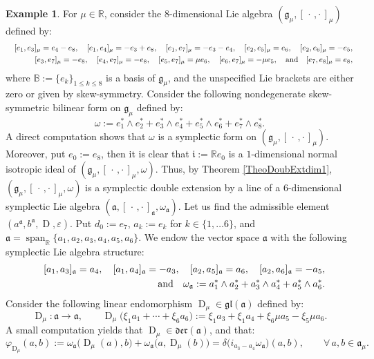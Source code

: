 \documentclass[final,1p,times,nopreprintline]{elsarticle}
\theoremstyle{definition}
\newtheorem{example}{Example}[section]
\numberwithin{equation}{section}
\newcommand{\rel}{\mathbb{R}}
\newcommand{\w}{\omega}
\newcommand{\et}{\quad \textnormal{and}\quad}
\newcommand{\g}{\mathfrak{g}}
\newcommand{\ai}{\mathfrak{a}}
\newcommand{\Span}{\operatorname{span}}
\numberwithin{equation}{section}
\newcommand{\D}{\operatorname{D}}
\newcommand{\gl}{\mathfrak{gl}}
\newcommand{\cro}{[\,\cdot\,,\cdot\,]}
\begin{document}
\begin{example}
For $\mu\in\rel$, consider the $8$-dimensional Lie algebra $(\g_\mu,\cro_\mu)$ defined by:
\begin{eqnarray*}
&&[e_1,e_3]_\mu=e_4-e_8,\quad [e_1,e_4]_\mu=-e_3+e_8,\quad [e_1,e_7]_\mu=-e_3-e_4,\quad [e_2,e_5]_\mu=e_6,\quad[e_2,e_6]_\mu=-e_5,\\
&&[e_3,e_7]_\mu=-e_8,\quad [e_4,e_7]_\mu=-e_8,\quad [e_5,e_7]_\mu=\mu e_6,\quad
[e_6,e_7]_\mu=-\mu e_5,\et [e_7,e_8]_\mu=e_8,
\end{eqnarray*}
where $\mathbb{B}:=\{e_k\}_{1\leqslant k\leqslant 8}$ is a basis of $\g_\mu$, and the unspecified Lie brackets are either zero or given by skew-symmetry. Consider the following nondegenerate skew-symmetric bilinear form on $\g_\mu$ defined by:
\begin{equation*}
\w:=e_1^*\wedge e_2^*+e_3^*\wedge e_4^*+e_5^*\wedge e_6^*+e_7^*\wedge e_8^*.
\end{equation*}
A direct computation shows that $\w$ is a symplectic form on $(\g_\mu,\cro_\mu)$. Moreover, put $e_0:=e_8$, then it is clear that $\mathfrak{i}:=\rel e_0$ is a $1$-dimensional normal isotropic ideal of $(\g_\mu,\cro_\mu,\w)$. Thus, by Theorem \ref{TheoDoubExtdim1}, $(\g_\mu,\cro_\mu,\w)$ is a symplectic double extension by a line of a $6$-dimensional symplectic Lie algebra $(\ai,\cro_{\ai},\w_{\ai})$. Let us find the admissible element $(a^{\ai},b^{\ai},\D,\varepsilon)$. Put $d_0:=e_7$, $a_k:=e_k$ for $k\in\{1,\ldots 6\}$, and $\ai=\Span_\rel\{a_1,a_2,a_3,a_4,a_5,a_6\}$. We endow the vector space $\ai$ with the following symplectic Lie algebra structure:
\begin{eqnarray*}
	&&[a_1,a_3]_{\ai}= a_4,\quad [a_1,a_4]_{\ai}=-a_3,\quad [a_2,a_5]_{\ai}= a_6,\quad [a_2,a_6]_{\ai}=-a_5,\\
	&&\et \w_{\ai}:=a^*_1\wedge a^*_2+a^*_3\wedge a^*_4+a^*_5\wedge a^*_6.
\end{eqnarray*} 
Consider the following linear endomorphism $\D_\mu\in\gl(\ai)$ defined by:
\begin{equation*}
\D_\mu:\ai\longrightarrow\ai,\qquad \D_\mu\big(\xi_1a_1+\cdots+\xi_6a_6\big):=\xi_1a_3+\xi_1a_4+\xi_6\mu a_5-\xi_5\mu a_6.
\end{equation*}
A small computation yields that $\D_\mu\in\mathfrak{der}(\ai)$, and that:
\begin{equation*}
\varphi_{\D_\mu}(a,b):=\w_{\ai}\big(\D_\mu(a),b\big)+\w_{\ai}\big(a,\D_\mu(b)\big)=\delta\big(i_{a_3-a_4}\w_{\ai}\big)(a,b),\qquad\forall\, a,b\in\ai_\mu.
\end{equation*}

\end{example}
\end{document}
